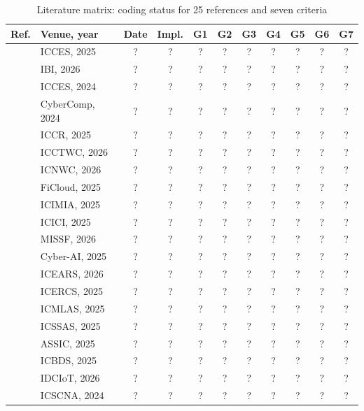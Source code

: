 \begin{table}[t]
\caption{Literature matrix: coding status for 25 references and seven criteria}
\label{tab:litmatrix}
\centering\small\setlength{\tabcolsep}{4pt}\renewcommand{\arraystretch}{1.15}
\begin{tabular}{@{}llccccccccc@{}}\toprule
\textbf{Ref.} & \textbf{Venue, year} & \textbf{Date} & \textbf{Impl.} & \textbf{G1} & \textbf{G2} & \textbf{G3} & \textbf{G4} & \textbf{G5} & \textbf{G6} & \textbf{G7} \\ \midrule
\cite{b1} & ICCES, 2025 & ? & ? & ? & ? & ? & ? & ? & ? & ? \\
\cite{b2} & IBI, 2026 & ? & ? & ? & ? & ? & ? & ? & ? & ? \\
\cite{b3} & ICCES, 2024 & ? & ? & ? & ? & ? & ? & ? & ? & ? \\
\cite{b4} & CyberComp, 2024 & ? & ? & ? & ? & ? & ? & ? & ? & ? \\
\cite{b5} & ICCR, 2025 & ? & ? & ? & ? & ? & ? & ? & ? & ? \\
\cite{b6} & ICCTWC, 2026 & ? & ? & ? & ? & ? & ? & ? & ? & ? \\
\cite{b7} & ICNWC, 2026 & ? & ? & ? & ? & ? & ? & ? & ? & ? \\
\cite{b8} & FiCloud, 2025 & ? & ? & ? & ? & ? & ? & ? & ? & ? \\
\cite{b9} & ICIMIA, 2025 & ? & ? & ? & ? & ? & ? & ? & ? & ? \\
\cite{b10} & ICICI, 2025 & ? & ? & ? & ? & ? & ? & ? & ? & ? \\
\cite{b11} & MISSF, 2026 & ? & ? & ? & ? & ? & ? & ? & ? & ? \\
\cite{b12} & Cyber-AI, 2025 & ? & ? & ? & ? & ? & ? & ? & ? & ? \\
\cite{b13} & ICEARS, 2026 & ? & ? & ? & ? & ? & ? & ? & ? & ? \\
\cite{b14} & ICERCS, 2025 & ? & ? & ? & ? & ? & ? & ? & ? & ? \\
\cite{b15} & ICMLAS, 2025 & ? & ? & ? & ? & ? & ? & ? & ? & ? \\
\cite{b16} & ICSSAS, 2025 & ? & ? & ? & ? & ? & ? & ? & ? & ? \\
\cite{b17} & ASSIC, 2025 & ? & ? & ? & ? & ? & ? & ? & ? & ? \\
\cite{b18} & ICBDS, 2025 & ? & ? & ? & ? & ? & ? & ? & ? & ? \\
\cite{b19} & IDCIoT, 2026 & ? & ? & ? & ? & ? & ? & ? & ? & ? \\
\cite{b20} & ICSCNA, 2024 & ? & ? & ? & ? & ? & ? & ? & ? & ? \\

\end{tabular}
\end{table}
